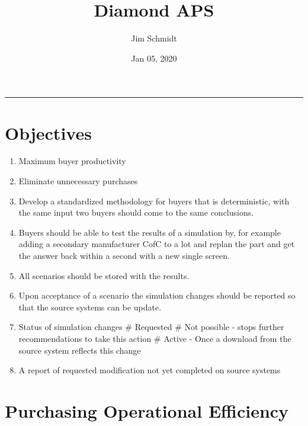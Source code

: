 \documentclass[letterpaper,10pt,english]{sphinxmanual}
\title{Diamond APS}
\date{Jan 05, 2020}
\author{Jim Schmidt}
\begin{document}
\pagestyle{empty}
\sphinxmaketitle
\pagestyle{plain}
\sphinxtableofcontents
\pagestyle{normal}
\label{\detokenize{index::doc}}

\bigskip\hrule\bigskip





\chapter{Objectives}
\label{\detokenize{BusinessProcessReengineering:objectives}}\begin{enumerate}
%
\item {} 
Maximum buyer productivity

\item {} 
Eliminate unnecessary purchases

\item {} 
Develop a standardized methodology for buyers that is deterministic,
with the same input two buyers should come to the same conclusions.

\item {} 
Buyers should be able to test the results of a simulation by, for
example adding a secondary manufacturer CofC to a lot and replan the
part and get the answer back within a second with a new single
screen.

\item {} 
All scenarios should be stored with the results.

\item {} 
Upon acceptance of a scenario the simulation changes should be
reported so that the source systems can be update.

\item {} 
Status of simulation changes \# Requested \# Not possible - stops
further recommendations to take this action \# Active - Once a
download from the source system reflects this change

\item {} 
A report of requested modification not yet completed on source
systems

\end{enumerate}


\chapter{Purchasing Operational Efficiency}
\label{\detokenize{BusinessProcessReengineering:purchasing-operational-efficiency}}
\end{document}
